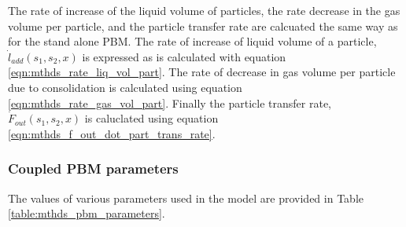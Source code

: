 \documentclass[preprint,11pt,authoryear]{elsarticle}
\begin{document}
%       
%           
%           
%           




The rate of increase of the liquid volume of particles, the rate decrease in the gas volume per particle, and the particle transfer rate are calcuated the same way as for the stand alone PBM. The rate of increase of liquid volume of a particle, $\dot{l}_{add}(s_1,s_2,x)$ is expressed as is calculated with equation \ref{eqn:mthds_rate_liq_vol_part}. The rate of decrease in gas volume per particle due to consolidation is calculated using equation \ref{eqn:mthds_rate_gas_vol_part}. Finally the particle transfer rate, $\dot{F}_{out}(s_1,s_2,x)$ is caluclated using equation \ref{eqn:mthds_f_out_dot_part_trans_rate}.

\subsubsection{Coupled PBM parameters}
The values of various parameters used in the model are provided in Table 
\ref{table:mthds_pbm_parameters}.
\end{document}
